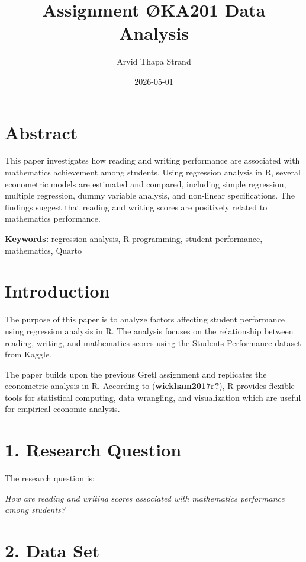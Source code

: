 \documentclass[
  letterpaper,
  DIV=11,
  numbers=noendperiod]{scrartcl}
\title{Assignment ØKA201 Data Analysis}
\author{Arvid Thapa Strand}
\date{2026-05-01}
\renewcommand*\contentsname{Table of contents}
\newcommand\contentsname{Table of contents}
\begin{document}
\maketitle

\renewcommand*\contentsname{Table of contents}
{
\setcounter{tocdepth}{3}
\tableofcontents
}
\listoffigures
\listoftables

\section{Abstract}\label{abstract}

This paper investigates how reading and writing performance are
associated with mathematics achievement among students. Using regression
analysis in R, several econometric models are estimated and compared,
including simple regression, multiple regression, dummy variable
analysis, and non-linear specifications. The findings suggest that
reading and writing scores are positively related to mathematics
performance.

\textbf{Keywords:} regression analysis, R programming, student
performance, mathematics, Quarto

\section{Introduction}\label{introduction}

The purpose of this paper is to analyze factors affecting student
performance using regression analysis in R. The analysis focuses on the
relationship between reading, writing, and mathematics scores using the
Students Performance dataset from Kaggle.

The paper builds upon the previous Gretl assignment and replicates the
econometric analysis in R. According to (\textbf{wickham2017r?}), R
provides flexible tools for statistical computing, data wrangling, and
visualization which are useful for empirical economic analysis.

\section{1. Research Question}\label{research-question}

The research question is:

\emph{How are reading and writing scores associated with mathematics
performance among students?}

\section{2. Data Set}\label{data-set}
\end{document}
